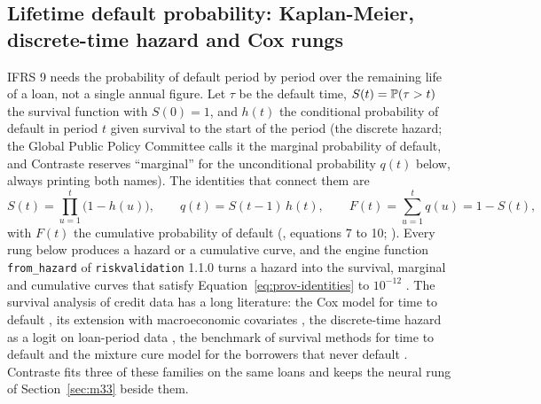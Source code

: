\subsection{Lifetime default probability: Kaplan-Meier, discrete-time hazard and Cox rungs}
\label{sec:m10}

IFRS 9 needs the probability of default period by period over the remaining life of a loan, not a single annual figure. Let $\tau$ be the
default time, $S(t)=\mathbb{P}(\tau>t)$ the survival function with $S(0)=1$, and $h(t)$ the conditional probability of default in period $t$
given survival to the start of the period (the discrete hazard; the Global Public Policy Committee calls it the marginal probability of default, and Contraste
reserves ``marginal'' for the unconditional probability $q(t)$ below, always printing both names). The identities that connect them are
\begin{equation}
S(t)=\prod_{u=1}^{t}\bigl(1-h(u)\bigr),\qquad q(t)=S(t-1)\,h(t),\qquad F(t)=\sum_{u=1}^{t}q(u)=1-S(t),
\label{eq:prov-identities}
\end{equation}
with $F(t)$ the cumulative probability of default (\citealt{provisions:botha2025tutorial}, equations 7 to 10; \citealt{provisions:bellini2019}). Every rung
below produces a hazard or a cumulative curve, and the engine function \texttt{from\_hazard} of \texttt{riskvalidation} 1.1.0 turns a
hazard into the survival, marginal and cumulative curves that satisfy Equation~\ref{eq:prov-identities} to $10^{-12}$ \citep{provisions:botha2025tutorial}. The
survival analysis of credit data has a long literature: the Cox model for time to default \citep{provisions:cox1972,provisions:banasik1999,provisions:stepanova2002},
its extension with macroeconomic covariates \citep{provisions:bellotti2009}, the discrete-time hazard as a logit on loan-period data
\citep{provisions:allison1982,provisions:shumway2001,provisions:bellotti2013}, the benchmark of survival methods for time to default
\citep{provisions:dirick2017} and the mixture cure model for the borrowers that never default \citep{provisions:tong2012}. Contraste fits three of these
families on the same loans and keeps the neural rung of Section~\ref{sec:m33} beside them.

